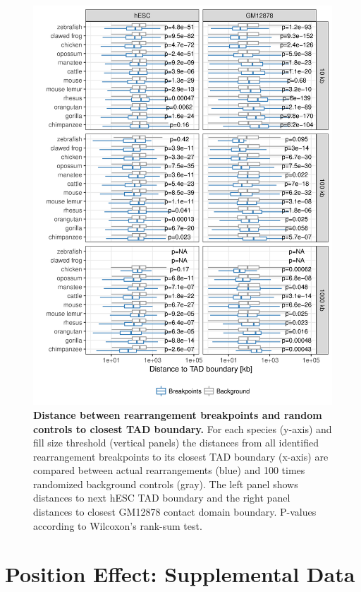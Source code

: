 \documentclass[a4paper,twoside=true,openright,parskip=full,chapterprefix=true,11pt,headings=normal,bibliography=totoc,listof=totoc,titlepage=on,captions=tableabove,draft=false]{scrreprt}
\theoremstyle{definition}
\theoremstyle{definition}
\theoremstyle{definition}
\theoremstyle{remark}
\begin{document}
\begin{figure}

{\centering \includegraphics[width=0.8\linewidth]{figures/TAD_evolution/fig_S2_v01} 

}

\caption{\textbf{Distance between rearrangement breakpoints and
random controls to closest TAD boundary.} For each species (y-axis) and
fill size threshold (vertical panels) the distances from all identified
rearrangement breakpoints to its closest TAD boundary (x-axis) are
compared between actual rearrangements (blue) and 100 times randomized
background controls (gray). The left panel shows distances to next hESC
TAD boundary and the right panel distances to closest GM12878 contact
domain boundary. P-values according to Wilcoxon's rank-sum test.}\label{fig:TadEvoS2}
\end{figure}










\hypertarget{sup-position-effect}{%
\chapter{Position Effect: Supplemental Data}\label{sup-position-effect}}
\end{document}
